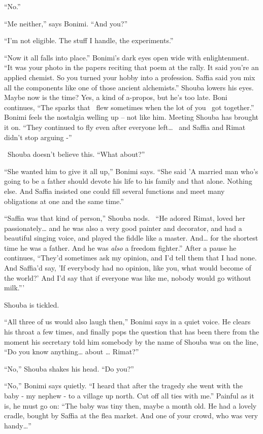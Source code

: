 \documentclass[twoside,11pt]{book}
\begin{document}
``No.''

``Me neither,'' says Bonimi. ``And you?''

``I'm not eligible. The stuff I handle, the experiments.''

``Now it all falls into place.'' Bonimi's dark eyes open wide with enlightenment.
``It was your photo in the papers reciting that poem at the rally. It said you're an applied chemist. So
you turned your hobby into a profession. Saffia said you mix all the components like one of those ancient
alchemists.'' Shouba lowers his eyes. Maybe now is the time? Yes, a kind of a-propos, but he's too late.
Boni continues, ``The sparks that \ flew sometimes when the lot of you \ got together.''
Bonimi feels the nostalgia welling up -- not like him. Meeting Shouba has brought it on. ``They continued
to fly even after everyone left{\dots} \ and Saffia and Rimat didn't stop arguing -''

~Shouba doesn't believe this. ``What about?''

``She wanted {him} to give it all up,'' Bonimi says. ``She said
'A married man who's going to be a father should devote his life to his family and that alone. Nothing else. And Saffia
insisted one could fill several functions and meet many obligations at one and the same time.''

``Saffia was that kind of person,'' Shouba nods. \ ``He adored Rimat, loved her
passionately{\dots} and he was also a very good painter and decorator, and had a beautiful singing voice, and played
the fiddle like a master. And{\dots} for the shortest time he was a father. And he was \textit{also} a freedom
fighter.'' After a pause he continues, ``They'd sometimes ask my opinion, and I'd tell them
that I had none. And Saffia'd say, 'If everybody had no opinion, like you, what would become of the world?' And I'd say
that if everyone was like me, nobody would go without milk.'''

Shouba is tickled.

``All three of us would also laugh then,'' Bonimi says in a quiet voice. He clears his throat
a few times, and finally pops the question that has been there from the moment his secretary told him somebody by the
name of Shouba was on the line, ``Do you know anything{\dots} about {\dots} Rimat?''

``No,'' Shouba shakes his head. ``Do you?''

``No,'' Bonimi says quietly. ``I heard that after the tragedy she went with the
baby - my nephew - to a village up north. Cut off all ties with me.'' Painful as it is, he must go on: ``The baby was
tiny then, maybe a month old. He had a lovely cradle, bought by Saffia at the flea market. And one of your crowd, who
was very handy{\dots}''
\end{document}
